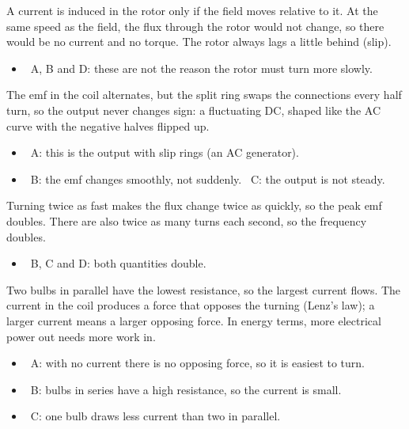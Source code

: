 \documentclass[12pt]{article}
\begin{document}
\begin{practiceanswers}
\begin{practiceans}
  A current is induced in the rotor only if the field moves relative to it. At the same speed as the
  field, the flux through the rotor would not change, so there would be no current and no torque. The
  rotor always lags a little behind (slip).
  \begin{itemize}
    \item \xmark\ A, B and D: these are not the reason the rotor must turn more slowly.
  \end{itemize}
\end{practiceans}

\begin{practiceans}
  The emf in the coil alternates, but the split ring swaps the connections every half turn, so the output
  never changes sign: a fluctuating DC, shaped like the AC curve with the negative halves flipped up.
  \begin{itemize}
    \item \xmark\ A: this is the output with slip rings (an AC generator).
    \item \xmark\ B: the emf changes smoothly, not suddenly. \quad \xmark\ C: the output is not steady.
  \end{itemize}
\end{practiceans}

\begin{practiceans}
  Turning twice as fast makes the flux change twice as quickly, so the peak emf doubles. There are also
  twice as many turns each second, so the frequency doubles.
  \begin{itemize}
    \item \xmark\ B, C and D: both quantities double.
  \end{itemize}
\end{practiceans}

\begin{practiceans}
  Two bulbs in parallel have the lowest resistance, so the largest current flows. The current in the
  coil produces a force that opposes the turning (Lenz's law); a larger current means a larger opposing
  force. In energy terms, more electrical power out needs more work in.
  \begin{itemize}
    \item \xmark\ A: with no current there is no opposing force, so it is easiest to turn.
    \item \xmark\ B: bulbs in series have a high resistance, so the current is small.
    \item \xmark\ C: one bulb draws less current than two in parallel.
  \end{itemize}
\end{practiceans}


\end{practiceanswers}
\end{document}
